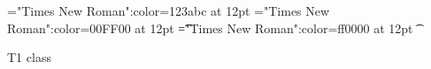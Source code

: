 \font\wzt="Times New Roman":color=123abc at 12pt
\font\zt="Times New Roman":color=00FF00 at 12pt
\font\t="Times New Roman":color=ff0000 at 12pt
\t{T1 class 

}
\bye
